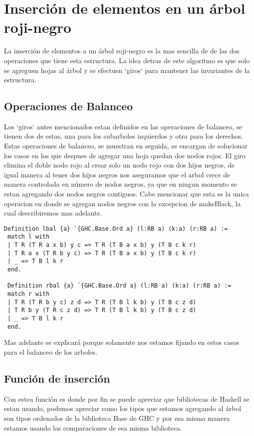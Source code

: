 \documentclass[letterpaper,12pt,oneside]{book}
\newcommand{\arn}{árbol roji-negro }
\theoremstyle{plain}
\theoremstyle{definition}
\theoremstyle{remark}
\begin{document}
\section{Inserción de elementos en un \arn}

La inserci\'on de elementos a un \arn es la mas sencilla de de las dos operaciones que tiene esta estructura. La idea detras de este algoritmo es que 
solo se agreguen hojas al \'arbol y se efectuen `giros` para mantener las invariantes de la estructura.
\subsection{Operaciones de Balanceo}
Los `giros` antes mencionados estan definidos en las operaciones de balanceo, se tienen dos de estas, una para los subarboles izquierdos y otra para los 
derechos. Estas operaciones de balanceo, se muestran en seguida, se encargan de solucionar los casos en los que despues de agregar una hoja quedan dos nodos rojos.
El giro elimina el doble nodo rojo al crear solo un nodo rojo con dos hijos negros, de igual manera al tener dos hijos negros nos aseguramos que el arbol crece de manera controlada 
en n\'umero de nodos negros, ya que en ningun momento se estan agregando dos nodos negros contiguos. Cabe mencionar que esta es la unica operacion en donde se agregan nodos negros con la excepcion de makeBlack, la cual describiremos mas adelante.
\begin{verbatim}
Definition lbal {a} `{GHC.Base.Ord a} (l:RB a) (k:a) (r:RB a) :=
 match l with
 | T R (T R a x b) y c => T R (T B a x b) y (T B c k r)
 | T R a x (T R b y c) => T R (T B a x b) y (T B c k r)
 | _ => T B l k r
 end.

 Definition rbal {a} `{GHC.Base.Ord a} (l:RB a) (k:a) (r:RB a) :=
 match r with
 | T R (T R b y c) z d => T R (T B l k b) y (T B c z d)
 | T R b y (T R c z d) => T R (T B l k b) y (T B c z d)
 | _ => T B l k r
 end.
\end{verbatim}

Mas adelante se explicar\'a porque solamente nos estamos fijando en estos casos para el balanceo de los arboles.
\subsection {Funci\'on de inserci\'on}
Con estea funci\'on es donde por fin se puede apreciar que bibliotecas de Haskell se estan usando, podemos apreciar como los tipos que estamos
agregando al \'arbol son tipos ordenados de la biblioteca Base de GHC y por esa misma manera estamos usando las comparaciones de esa misma biblioteca.
\end{document}
